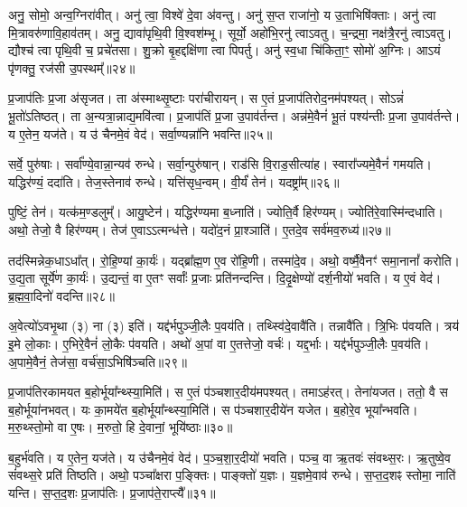 अनु॒ सोमो॒ अन्व॒ग्निरा॑वीत्।
अनु॑ त्वा॒ विश्वे॑ दे॒वा अ॑वन्तु।
अनु॑ स॒प्त राजा॑नो॒ य उ॒ताभिषि॑क्ताः।
अनु॑ त्वा मि॒त्रावरु॑णावि॒हाव॑तम्।
अनु॒ द्यावा॑पृथि॒वी वि॒श्वश॑म्भू।
सूर्यो॒ अहो॑भि॒रनु॑\- त्वाऽवतु।
च॒न्द्रमा॒ नक्ष॑त्रै॒रनु॑\- त्वाऽवतु।
द्यौश्च॑ त्वा पृथि॒वी च॒ प्रचे॑तसा।
शु॒क्रो बृ॒हद्दक्षि॑णा त्वा पिपर्तु।
अनु॑ स्व॒धा चि॑किता॒ꣳ॒ सोमो॑ अ॒ग्निः।
आऽयं पृ॑णक्तु॒ रज॑सी उ॒पस्थम्᳚॥२४॥\anuvakamend[बृह॒स्पतिः॒ सोमो॑ अ॒ग्निरेकं॑ च]

प्र॒जा\-प॑तिः प्र॒जा अ॑\-सृजत।
ता अ॑स्माथ्सृ॒ष्टाः परा॑चीरायन्।
स ए॒तं प्र॒जा\-प॑तिरोद॒नम॑पश्यत्।
सोऽन्नं॑ भू॒तो॑\-ऽतिष्ठत्।
ता अ॒न्यत्रा॒न्नाद्य॒मवि॑त्वा।
प्र॒जा\-प॑तिं प्र॒जा उ॒पाव॑र्तन्त।
अन्न॑मे॒वैनं॑ भू॒तं पश्य॑न्तीः प्र॒जा उ॒पाव॑र्तन्ते।
य ए॒तेन॒ यज॑ते।
य उ॑ चैनमे॒वं वेद॑।
सर्वा॒ण्यन्ना॑नि भवन्ति॥२५॥

सर्वे॒ पुरु॑षाः।
सर्वा᳚ण्ये॒वान्ना॒न्यव॑ रुन्धे।
सर्वा॒न्पुरु॑षान्।
राड॑सि वि॒राड॒सीत्या॑ह।
स्वारा᳚ज्यमे॒वैनं॑ गमयति।
यद्धिर॑ण्यं॒ ददा॑ति।
तेज॒स्तेनाव॑ रुन्धे।
यत्ति॑सृध॒न्वम्।
वी॒र्यं॑ तेन॑।
यदष्ट्रा᳚म्॥२६॥

पुष्टिं॒ तेन॑।
यत्क॑म॒ण्डलुम्᳚।
आयु॒ष्टेन॑।
यद्धिर॑ण्यमा ब॒ध्नाति॑।
ज्योति॒र्वै हिर॑ण्यम्।
ज्योति॑रे॒वास्मि॑न्दधाति।
अथो॒ तेजो॒ वै हिर॑ण्यम्।
तेज॑ ए॒वाऽऽत्मन्ध॑त्ते।
यदो॑द॒नं प्रा॒श्ञाति॑।
ए॒तदे॒व सर्व॑मव॒रुध्य॑॥२७॥

तद॑स्मिन्नेक॒धा\-ऽधा᳚त्।
रो॒हि॒ण्यां का॒र्यः॑।
यद्ब्रा᳚ह्म॒ण ए॒व रो॑हि॒णी।
तस्मा॑दे॒व।
अथो॒ वर्ष्मै॒वैनꣳ॑ समा॒नानां᳚ करोति।
उ॒द्य॒ता सूर्ये॑ण का॒र्यः॑।
उ॒द्यन्तं॒ वा ए॒तꣳ सर्वाः᳚ प्र॒जाः प्रति॑\-नन्दन्ति।
दि॒दृ॒क्षेण्यो॑ दर्\mbox{}श॒नीयो॑ भवति।
य ए॒वं वेद॑।
ब्र॒ह्म॒वा॒दिनो॑ वदन्ति॥२८॥

अ॒वेत्यो॑\-ऽवभृ॒था (३) ना (३) इति॑।
यद्द॑र्भपुञ्जी॒लैः प॒वय॑ति।
तथ्स्वि॑दे॒वावै॑ति।
तन्नावै॑ति।
त्रि॒भिः प॑वयति।
त्रय॑ इ॒मे लो॒काः।
ए॒भिरे॒वैनं॑ लो॒कैः प॑वयति।
अथो॑ अ॒पां वा ए॒तत्तेजो॒ वर्चः॑।
यद्द॒र्भाः।
यद्द॑र्भपुञ्जी॒लैः प॒वय॑ति।
अ॒पामे॒वैनं॒ तेज॑सा॒ वर्च॑सा॒\-ऽभिषि॑ञ्चति॥२९॥\anuvakamend[भ॒व॒न्त्यष्ट्रा॑मव॒रुध्य॑ वदन्ति द॒र्भा यद्द॑र्भपुञ्जी॒लैः प॒वय॒त्येकं॑ च]

प्र॒जा\-प॑तिरकामयत ब॒होर्भूया᳚न्थ्स्या॒मिति॑।
स ए॒तं प॑ञ्चशार॒दीय॑मपश्यत्।
तमाऽह॑रत्।
तेना॑यजत।
ततो॒ वै स ब॒होर्भूया॑नभवत्।
यः का॒मये॑त ब॒होर्भूया᳚न्थ्स्या॒मिति॑।
स प॑ञ्चशार॒दीये॑न यजेत।
ब॒होरे॒व भूया᳚न्भवति।
म॒रु॒थ्स्तो॒मो वा ए॒षः।
म॒रुतो॒ हि दे॒वानां॒ भूयि॑ष्ठाः॥३०॥

ब॒हुर्भ॑वति।
य ए॒तेन॒ यज॑ते।
य उ॑चैनमे॒वं वेद॑।
प॒ञ्च॒शा॒र॒दीयो॑ भवति।
पञ्च॒ वा ऋ॒तवः॑ संवथ्स॒रः।
ऋ॒तुष्वे॒व सं॑वथ्स॒रे प्रति॑ तिष्ठति।
अथो॒ पञ्चा᳚क्षरा प॒ङ्क्तिः।
पाङ्क्तो॑ य॒ज्ञः।
य॒ज्ञमे॒वाव॑ रुन्धे।
स॒प्त॒द॒शꣴ स्तोमा॒ नाति॑ यन्ति।
स॒प्त॒द॒शः प्र॒जा\-प॑तिः।
प्र॒जा\-प॑ते॒राप्त्यै᳚॥३१॥\anuvakamend[भूयि॑ष्ठा यन्ति॒ द्वे च॑]

